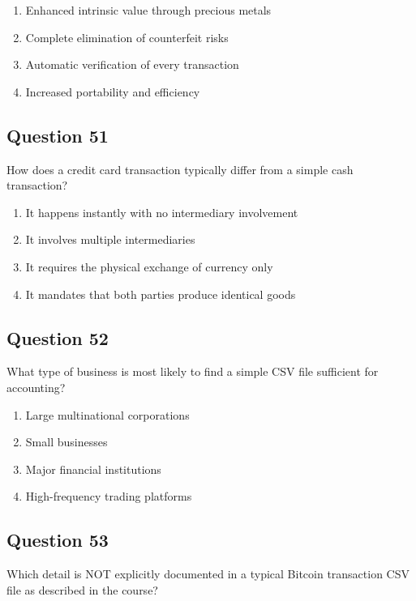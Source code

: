 \documentclass[12pt,a4paper]{article}
\begin{document}
\begin{enumerate}[label=\Alph*., leftmargin=*]
\item Enhanced intrinsic value through precious metals
\item Complete elimination of counterfeit risks
\item Automatic verification of every transaction
\item Increased portability and efficiency
\end{enumerate}

\bigskip


\subsection*{Question 51}
How does a credit card transaction typically differ from a simple cash transaction?

\begin{enumerate}[label=\Alph*., leftmargin=*]
\item It happens instantly with no intermediary involvement
\item It involves multiple intermediaries
\item It requires the physical exchange of currency only
\item It mandates that both parties produce identical goods
\end{enumerate}

\bigskip


\subsection*{Question 52}
What type of business is most likely to find a simple CSV file sufficient for accounting?

\begin{enumerate}[label=\Alph*., leftmargin=*]
\item Large multinational corporations
\item Small businesses
\item Major financial institutions
\item High-frequency trading platforms
\end{enumerate}

\bigskip


\subsection*{Question 53}
Which detail is NOT explicitly documented in a typical Bitcoin transaction CSV file as described in the course?
\end{document}
